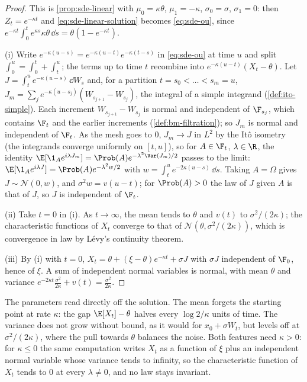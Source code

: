 \begin{proof}
This is \cref{prop:sde-linear} with $\mu_0=\kappa\theta$, $\mu_1=-\kappa$,
$\sigma_0=\sigma$, $\sigma_1=0$: then $Z_t=e^{-\kappa t}$ and
\eqref{eq:sde-linear-solution} becomes \eqref{eq:sde-ou}, since
$e^{-\kappa t}\int_0^te^{\kappa s}\kappa\theta\,\dd s=\theta(1-e^{-\kappa t})$.

(i) Write $e^{-\kappa(u-s)}=e^{-\kappa(u-t)}e^{-\kappa(t-s)}$ in \eqref{eq:sde-ou} at time
$u$ and split $\int_0^u=\int_0^t+\int_t^u$; the terms up to time $t$ recombine into
$e^{-\kappa(u-t)}(X_t-\theta)$. Let $J=\int_t^ue^{-\kappa(u-s)}\,\dd W_s$ and, for a partition
$t=s_0<\dots<s_m=u$, $J_m=\sum_je^{-\kappa(u-s_j)}(W_{s_{j+1}}-W_{s_j})$, the integral of a
simple integrand (\cref{def:ito-simple}). Each increment $W_{s_{j+1}}-W_{s_j}$ is normal and
independent of $\F_{s_j}$, which contains $\F_t$ and the earlier increments
(\cref{def:bm-filtration}); so $J_m$ is normal and independent of $\F_t$. As the mesh goes
to $0$, $J_m\to J$ in $L^2$ by the It\^o isometry (the integrands converge uniformly on
$[t,u]$), so for $A\in\F_t$, $\lambda\in\R$, the identity
$\E[\1_Ae^{i\lambda J_m}]=\Prob(A)e^{-\lambda^2\Var(J_m)/2}$ passes to the limit:
$\E[\1_Ae^{i\lambda J}]=\Prob(A)e^{-\lambda^2w/2}$ with
$w=\int_t^ue^{-2\kappa(u-s)}\,\dd s$. Taking $A=\Omega$ gives $J\sim\mathcal N(0,w)$, and
$\sigma^2w=v(u-t)$; for $\Prob(A)>0$ the law of $J$ given $A$ is that of $J$, so $J$ is
independent of $\F_t$.

(ii) Take $t=0$ in (i). As $t\to\infty$, the mean tends to $\theta$ and $v(t)$ to
$\sigma^2/(2\kappa)$; the characteristic functions of $X_t$ converge to that of
$\mathcal N(\theta,\sigma^2/(2\kappa))$, which is convergence in law by Lévy's continuity
theorem.

(iii) By (i) with $t=0$, $X_t=\theta+(\xi-\theta)e^{-\kappa t}+\sigma J$ with $\sigma J$
independent of $\F_0$, hence of $\xi$. A sum of independent normal variables is normal, with mean
$\theta$ and variance $e^{-2\kappa t}\frac{\sigma^2}{2\kappa}+v(t)=\frac{\sigma^2}{2\kappa}$.
\end{proof}

The parameters read directly off the solution. The mean forgets the starting point at
rate $\kappa$: the gap $\E[X_t]-\theta$ halves every $\log2/\kappa$ units of time. The
variance does not grow without bound, as it would for $x_0+\sigma W_t$, but levels off at
$\sigma^2/(2\kappa)$, where the pull towards $\theta$ balances the noise. Both features need
$\kappa>0$: for $\kappa\le0$ the same computation writes $X_t$ as a function of $\xi$ plus an
independent normal variable whose variance tends to infinity, so the characteristic function
of $X_t$ tends to $0$ at every $\lambda\ne0$, and no law stays invariant.

